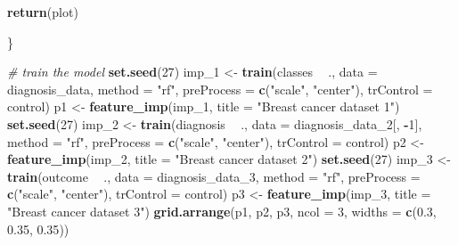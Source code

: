 \documentclass[]{article}
\newenvironment{Shaded}{\begin{snugshade}}{\end{snugshade}}
\newcommand{\KeywordTok}[1]{\textcolor[rgb]{0.13,0.29,0.53}{\textbf{#1}}}
\newcommand{\DataTypeTok}[1]{\textcolor[rgb]{0.13,0.29,0.53}{#1}}
\newcommand{\DecValTok}[1]{\textcolor[rgb]{0.00,0.00,0.81}{#1}}
\newcommand{\FloatTok}[1]{\textcolor[rgb]{0.00,0.00,0.81}{#1}}
\newcommand{\StringTok}[1]{\textcolor[rgb]{0.31,0.60,0.02}{#1}}
\newcommand{\CommentTok}[1]{\textcolor[rgb]{0.56,0.35,0.01}{\textit{#1}}}
\newcommand{\OperatorTok}[1]{\textcolor[rgb]{0.81,0.36,0.00}{\textbf{#1}}}
\newcommand{\NormalTok}[1]{#1}
\begin{document}
\begin{Shaded}
\begin{Highlighting}[]
  \KeywordTok{return}\NormalTok{(plot)}
  
\NormalTok{\}}
\end{Highlighting}
\end{Shaded}

\begin{Shaded}
\begin{Highlighting}[]
\CommentTok{# train the model}
\KeywordTok{set.seed}\NormalTok{(}\DecValTok{27}\NormalTok{)}
\NormalTok{imp_}\DecValTok{1}\NormalTok{ <-}\StringTok{ }\KeywordTok{train}\NormalTok{(classes }\OperatorTok{~}\StringTok{ }\NormalTok{., }\DataTypeTok{data =}\NormalTok{ diagnosis_data, }\DataTypeTok{method =} \StringTok{"rf"}\NormalTok{, }\DataTypeTok{preProcess =} \KeywordTok{c}\NormalTok{(}\StringTok{"scale"}\NormalTok{, }\StringTok{"center"}\NormalTok{), }\DataTypeTok{trControl =}\NormalTok{ control)}
\NormalTok{p1 <-}\StringTok{ }\KeywordTok{feature_imp}\NormalTok{(imp_}\DecValTok{1}\NormalTok{, }\DataTypeTok{title =} \StringTok{"Breast cancer dataset 1"}\NormalTok{)}
\KeywordTok{set.seed}\NormalTok{(}\DecValTok{27}\NormalTok{)}
\NormalTok{imp_}\DecValTok{2}\NormalTok{ <-}\StringTok{ }\KeywordTok{train}\NormalTok{(diagnosis }\OperatorTok{~}\StringTok{ }\NormalTok{., }\DataTypeTok{data =}\NormalTok{ diagnosis_data_}\DecValTok{2}\NormalTok{[, }\OperatorTok{-}\DecValTok{1}\NormalTok{], }\DataTypeTok{method =} \StringTok{"rf"}\NormalTok{, }\DataTypeTok{preProcess =} \KeywordTok{c}\NormalTok{(}\StringTok{"scale"}\NormalTok{, }\StringTok{"center"}\NormalTok{), }\DataTypeTok{trControl =}\NormalTok{ control)}
\NormalTok{p2 <-}\StringTok{ }\KeywordTok{feature_imp}\NormalTok{(imp_}\DecValTok{2}\NormalTok{, }\DataTypeTok{title =} \StringTok{"Breast cancer dataset 2"}\NormalTok{)}
\KeywordTok{set.seed}\NormalTok{(}\DecValTok{27}\NormalTok{)}
\NormalTok{imp_}\DecValTok{3}\NormalTok{ <-}\StringTok{ }\KeywordTok{train}\NormalTok{(outcome }\OperatorTok{~}\StringTok{ }\NormalTok{., }\DataTypeTok{data =}\NormalTok{ diagnosis_data_}\DecValTok{3}\NormalTok{, }\DataTypeTok{method =} \StringTok{"rf"}\NormalTok{, }\DataTypeTok{preProcess =} \KeywordTok{c}\NormalTok{(}\StringTok{"scale"}\NormalTok{, }\StringTok{"center"}\NormalTok{), }\DataTypeTok{trControl =}\NormalTok{ control)}
\NormalTok{p3 <-}\StringTok{ }\KeywordTok{feature_imp}\NormalTok{(imp_}\DecValTok{3}\NormalTok{, }\DataTypeTok{title =} \StringTok{"Breast cancer dataset 3"}\NormalTok{)}
\KeywordTok{grid.arrange}\NormalTok{(p1, p2, p3, }\DataTypeTok{ncol =} \DecValTok{3}\NormalTok{, }\DataTypeTok{widths =} \KeywordTok{c}\NormalTok{(}\FloatTok{0.3}\NormalTok{, }\FloatTok{0.35}\NormalTok{, }\FloatTok{0.35}\NormalTok{))}
\end{Highlighting}
\end{Shaded}
\end{document}
